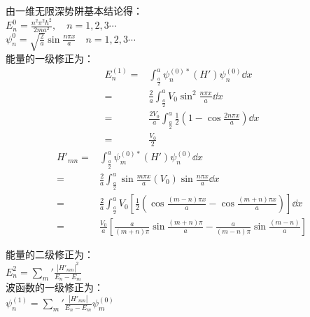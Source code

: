 \subsection{ }
由一维无限深势阱基本结论得：\\

$E^{0}_{n} = \frac{n^{2} \pi^{2} \hbar^{2}}{2ma^{2}},\quad n = 1,2,3\cdots $ \\

$\psi^{0}_{n} = \sqrt{\frac{2}{a}} \sin{\frac{n \pi x}{a}}\quad n = 1,2,3\cdots $ \\

能量的一级修正为：\\
\begin{equation}
\begin{aligned}
E^{(1)}_{n} =& \int^{a}_{\frac{a}{2}} \psi^{(0)*}_{n} (H') \psi^{(0)}_{n} \dd{x} \\
=& \frac{2}{a} \int^{a}_{\frac{a}{2}} V_{0} \sin^{2}{\frac{n \pi x}{a}} \dd{x} \\
=& \frac{2V_{0}}{a} \int^{a}_{\frac{a}{2}} \frac{1}{2} (1-\cos{\frac{2n \pi x}{a}}) \dd{x} \\
=& \frac{V_{0}}{2}
\end{aligned}
\end{equation}
\begin{equation}
\begin{aligned}
H'_{mn} =& \int^{a}_{\frac{a}{2}} \psi^{(0)*}_{m}(H') \psi^{(0)}_{n} \dd{x} \\
=& \frac{2}{a} \int^{a}_{\frac{a}{2}} \sin{\frac{m \pi x}{a}} (V_{0}) \sin{\frac{n \pi x}{a}} \dd{x} \\
=& \frac{2}{a} \int^{a}_{\frac{a}{2}} V_{0} \left[ \frac{1}{2} (\cos{\frac{(m-n) \pi x}{a}} - \cos{\frac{(m+n) \pi x}{a}}) \right] \dd{x} \\
=& \frac{V_{0}}{a} \left[ \frac{a}{(m+n)\pi} \sin{\frac{(m+n)\pi}{a}} - \frac{a}{(m-n)\pi} \sin{\frac{(m-n)}{a}} \right]
\end{aligned}
\end{equation}

能量的二级修正为：\\

$\displaystyle E^{2}_{n} = \sum_{m}' \frac{\left| H'_{mn} \right|^{2}}{E_{n} - E_{m}} $ \\

波函数的一级修正为：\\

$\displaystyle \psi^{(1)}_{n} = \sum_{m}' \frac{\left| H'_{mn} \right|}{E_{n} - E_{m}} \psi^{(0)}_{m} $ \\

